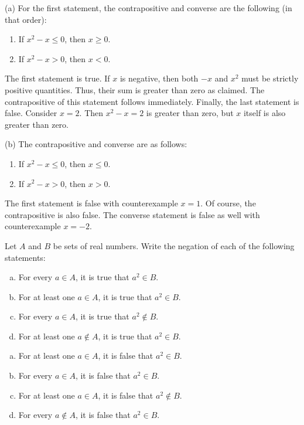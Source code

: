 \documentclass{zupan}
\begin{document}
\begin{solution}
  (a) For the first statement, the contrapositive and converse are the
  following (in that order):

  \begin{enumerate}[noitemsep]
    \item If $x^2 - x \leq 0$, then $x \geq 0$.
    \item If $x^2 - x > 0$, then $x < 0$.
  \end{enumerate}

  The first statement is true. If $x$ is negative, then both $-x$ and $x^2$
  must be strictly positive quantities. Thus, their sum is greater than zero as
  claimed. The contrapositive of this statement follows immediately. Finally,
  the last statement is false. Consider $x = 2$. Then $x^2 - x = 2$ is greater
  than zero, but $x$ itself is also greater than zero.

  (b) The contrapositive and converse are as follows:

  \begin{enumerate}[noitemsep]
    \item If $x^2 - x \leq 0$, then $x \leq 0$.
    \item If $x^2 - x > 0$, then $x > 0$.
  \end{enumerate}

  The first statement is false with counterexample $x = 1$. Of course, the
  contrapositive is also false. The converse statement is false as well with
  counterexample $x = -2$.
\end{solution}

\begin{problem}{4}
  Let $A$ and $B$ be sets of real numbers. Write the negation of each of the
  following statements:

  \begin{enumerate}[(a), noitemsep]
    \item For every $a \in A$, it is true that $a^2 \in B$.
    \item For at least one $a \in A$, it is true that $a^2 \in B$.
    \item For every $a \in A$, it is true that $a^2 \notin B$.
    \item For at least one $a \notin A$, it is true that $a^2 \in B$.
  \end{enumerate}
\end{problem}

\begin{solution}
  \begin{enumerate}[(a), noitemsep]
    \item For at least one $a \in A$, it is false that $a^2 \in B$.
    \item For every $a \in A$, it is false that $a^2 \in B$.
    \item For at least one $a \in A$, it is false that $a^2 \notin B$.
    \item For every $a \notin A$, it is false that $a^2 \in B$.
  \end{enumerate}
\end{solution}
\end{document}
